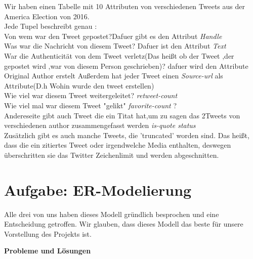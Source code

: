 Wir haben einen Tabelle mit 10 Attributen von verschiedenen Tweets aus der America Election von 2016.\\
Jede Tupel beschreibt genau :\\
Von wem war den Tweet gepostet?Dafuer gibt es den Attribut {\itshape Handle}\\
Was war die Nachricht von diesem Tweet? Dafuer ist den Attribut {\itshape Text}\\
War die Authenticität von dem Tweet verletz(Das heißt ob der Tweet ,der gepostet wird ,war von diesem Person geschrieben)? 
dafuer wird den Attribute Original Author erstelt
Außerdem hat jeder Tweet einen {\itshape Source-url} als Attribute(D.h Wohin  wurde den tweet erstellen)\\
Wie viel war  diesem Tweet weitergeleitet?  {\itshape retweet-count}\\
Wie viel mal war diesem Tweet "gelikt" {\itshape favorite-count }?\\

Andereseite gibt auch Tweet die ein Titat hat,um zu sagen das 2Tweets von verschiedenen author zusammengefasst werden {\itshape is-quote status}\\
Zusätzlich gibt es auch manche Tweets, die 'truncated' worden sind. Das heißt, dass die ein zitiertes Tweet oder irgendwelche Media enthalten, deswegen überschritten sie das Twitter Zeichenlimit und werden abgeschnitten.\\ 

\section{Aufgabe: ER-Modelierung}

Alle drei von uns haben dieses Modell gründlich besprochen und eine Entscheidung getroffen. Wir glauben, dass dieses Modell das beste für unsere Vorstellung des Projekts ist.

\textbf{Probleme und Lösungen}\\


